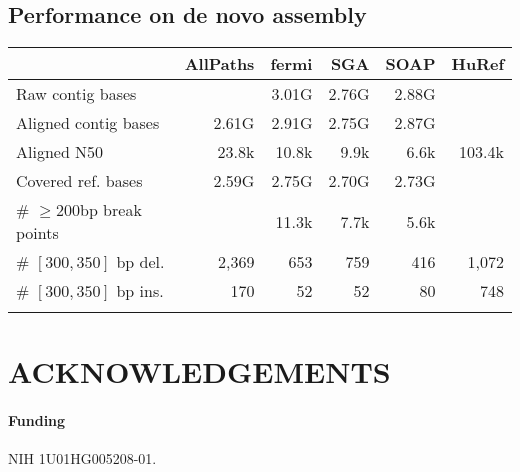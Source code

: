 \documentclass{bioinfo}
\begin{document}
\subsection{Performance on de novo assembly}

\begin{table}[!htb]
{\begin{tabular}{lrrrrr}
\toprule
& AllPaths & fermi & SGA & SOAP & HuRef \\
\midrule
Raw contig bases & & 3.01G & 2.76G & 2.88G & \\
Aligned contig bases & 2.61G & 2.91G & 2.75G & 2.87G & \\
Aligned N50 & 23.8k & 10.8k & 9.9k & 6.6k & 103.4k \\
Covered ref. bases & 2.59G & 2.75G & 2.70G & 2.73G & \\
\# $\ge200$bp break points & & 11.3k & 7.7k & 5.6k & \\
\# $[300,350]$ bp del. & 2,369 & 653 & 759 & 416 & 1,072 \\
\# $[300,350]$ bp ins. & 170 & 52 & 52 & 80 & 748 \\
\botrule
\end{tabular}}{}
\end{table}

\section*{ACKNOWLEDGEMENTS}

\paragraph{Funding\textcolon} NIH 1U01HG005208-01.

\end{document}
